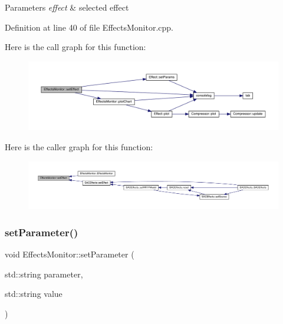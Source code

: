 \begin{DoxyParams}{Parameters}
{\em effect} & selected effect \\
\hline
\end{DoxyParams}


Definition at line 40 of file Effects\+Monitor.\+cpp.

Here is the call graph for this function\+:
\nopagebreak
\begin{figure}[H]
\begin{center}
\leavevmode
\includegraphics[width=350pt]{class_effects_monitor_ade184df36063a2c7ef2855c12265bd78_cgraph}
\end{center}
\end{figure}
Here is the caller graph for this function\+:
\nopagebreak
\begin{figure}[H]
\begin{center}
\leavevmode
\includegraphics[width=350pt]{class_effects_monitor_ade184df36063a2c7ef2855c12265bd78_icgraph}
\end{center}
\end{figure}
\mbox{\label{class_effects_monitor_a96ff58c6076dd68e03aea26896b69d78}} 
\subsubsection{\texorpdfstring{set\+Parameter()}{setParameter()}}
{\footnotesize\ttfamily void Effects\+Monitor\+::set\+Parameter (\begin{DoxyParamCaption}\item[{std\+::string}]{parameter,  }\item[{std\+::string}]{value }\end{DoxyParamCaption})}


